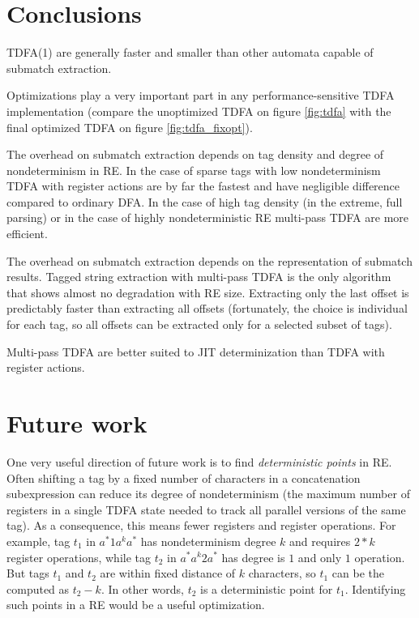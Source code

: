 \documentclass[]{article}
\begin{document}
\section{Conclusions}\label{section_conclusions}

TDFA(1) are generally faster and smaller than other automata capable of submatch extraction.
\medskip

Optimizations play a very important part in any performance-sensitive TDFA implementation
(compare the unoptimized TDFA on figure \ref{fig:tdfa} with the final optimized TDFA on figure \ref{fig:tdfa_fixopt}).
\medskip

The overhead on submatch extraction depends on tag density and degree of nondeterminism in RE.
In the case of sparse tags with low nondeterminism TDFA with register actions are by far the fastest and have negligible difference compared to ordinary DFA.
In the case of high tag density (in the extreme, full parsing) or in the case of highly nondeterministic RE
multi-pass TDFA are more efficient.
\medskip

The overhead on submatch extraction depends on the representation of submatch results.
Tagged string extraction with multi-pass TDFA is the only algorithm that shows almost no degradation with RE size.
Extracting only the last offset is predictably faster than extracting all offsets
(fortunately, the choice is individual for each tag, so all offsets can be extracted only for a selected subset of tags).
\medskip

Multi-pass TDFA are better suited to JIT determinization than TDFA with register actions.
\medskip

\section{Future work}\label{section_future_work}

One very useful direction of future work is to find \emph{deterministic points} in RE.
Often shifting a tag by a fixed number of characters in a concatenation subexpression can reduce its degree of nondeterminism
(the maximum number of registers in a single TDFA state needed to track all parallel versions of the same tag).
As a consequence, this means fewer registers and register operations.
For example, tag $t_1$ in $a^* 1 a^k a^*$ has nondeterminism degree $k$ and requires $2*k$ register operations,
while tag $t_2$ in $a^* a^k 2 a^*$ has degree is $1$ and only $1$ operation.
But tags $t_1$ and $t_2$ are within fixed distance of $k$ characters, so $t_1$ can be the computed as $t_2 - k$.
In other words, $t_2$ is a deterministic point for $t_1$.
Identifying such points in a RE would be a useful optimization.
\end{document}
